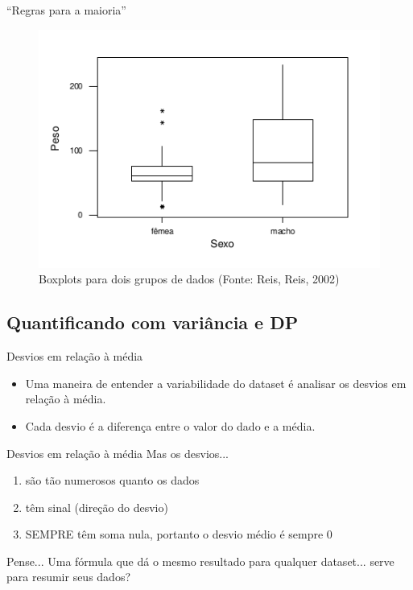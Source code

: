 \documentclass{beamer}
\begin{document}
\begin{frame}{``Regras para a maioria''}
  \begin{figure}
    \centering
    \includegraphics[height=0.7\textheight]{Desc_II/boxplot3}
    \caption{Boxplots para dois grupos de dados (Fonte: Reis, Reis,
      2002)}
  \end{figure}
\end{frame}

\subsection{Quantificando com variância e DP}

\begin{frame}{Desvios em relação à média}
  \begin{itemize}
  \item Uma maneira de entender a variabilidade do dataset é analisar
    os desvios em relação à média.
  \item Cada desvio é a diferença entre o valor do dado e a média.
  \end{itemize}
\end{frame}

\begin{frame}{Desvios em relação à média}
  Mas os desvios...
  \begin{enumerate}
  \item são tão numerosos quanto os dados
  \item têm sinal (direção do desvio)
  \item SEMPRE têm soma \alert{nula}, portanto o desvio médio é sempre 0
  \end{enumerate}
  \begin{block}{Pense...}
    Uma fórmula que dá o mesmo resultado para qualquer dataset... serve para resumir seus dados?
  \end{block}
\end{frame}
\end{document}
